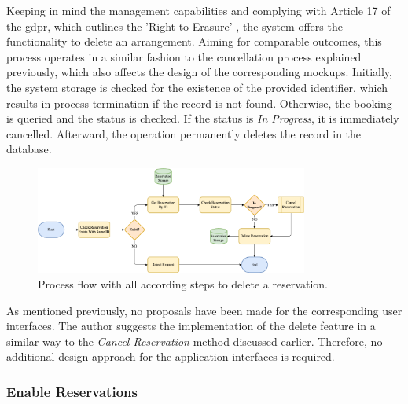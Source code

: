 Keeping in mind the management capabilities and complying with Article 17 of the \acrfull{gdpr}, which outlines the 'Right to Erasure' \cite{noauthor_art_2018}, the system offers the functionality to delete an arrangement.
Aiming for comparable outcomes, this process operates in a similar fashion to the cancellation process explained previously, which also affects the design of the corresponding mockups.
Initially, the system storage is checked for the existence of the provided identifier, which results in process termination if the record is not found.
Otherwise, the booking is queried and the status is checked. If the status is \textit{In Progress}, it is immediately cancelled. Afterward, the operation permanently deletes the record in the database.

\begin{figure}[h]
    \centering
    \includegraphics[width=0.8\textwidth,keepaspectratio]{resources/images/main/5_design/processes/ReservationDelete.png}
    \caption{Process flow with all according steps to delete a reservation.}
    \label{fig:delete-reservation-flowchart}
\end{figure}

\noindent As mentioned previously, no proposals have been made for the corresponding user interfaces. The author suggests the implementation of the delete feature in a similar way to the \textit{Cancel Reservation} method discussed earlier.
Therefore, no additional design approach for the application interfaces is required.

\subsubsection{Enable Reservations}
\label{ch:Design:sec:Reservation System:ssec:Management Capabilities:sssec:Enable Reservations}

